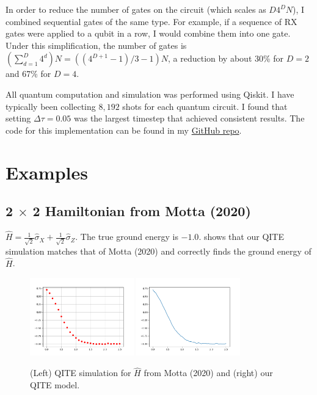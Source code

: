 \documentclass{article}
\newcounter{example}[section]
\begin{document}
In order to reduce the number of gates on the circuit (which scales as $D 4^D N$), I combined sequential gates of the same type.
For example, if a sequence of RX gates were applied to a qubit in a row, I would combine them into one gate.
Under this simplification, the number of gates is $(\sum_{d=1}^{D} 4^d) N = ((4^{D+1} - 1) / 3 - 1) N$, a reduction by about 30\% for $D=2$ and 67\% for $D=4$.

All quantum computation and simulation was performed using Qiskit.
I have typically been collecting $8,192$ shots for each quantum circuit.
I found that setting $\Delta \tau = 0.05$ was the largest timestep that achieved consistent results.
The code for this implementation can be found in my \href{https://github.com/leonlufkin/cognition_qite}{GitHub repo}.

\section{Examples}
\subsection{2 $\times$ 2 Hamiltonian from Motta (2020)}
$\hat{H} = \frac{1}{\sqrt{2}} \hat{\sigma}_X + \frac{1}{\sqrt{2}} \hat{\sigma}_Z$.
The true ground energy is $-1.0$.
 shows that our QITE simulation matches that of Motta (2020) and correctly finds the ground energy of $\hat{H}$.
\begin{figure}
    \centering
    \includegraphics[width=0.4\textwidth]{2x2_Motta.png}
    \includegraphics[width=0.4\textwidth]{2x2_ex.png}
    \caption{(Left) QITE simulation for $\hat{H}$ from Motta (2020) and (right) our QITE model.}
    \label{fig:2x2}
\end{figure}
\end{document}
